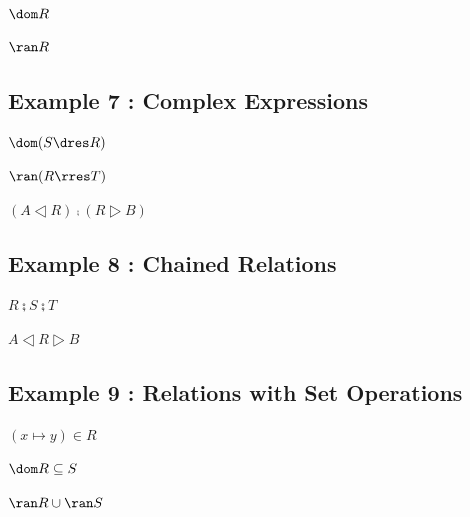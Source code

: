 \documentclass[a4paper,10pt,fleqn]{article}
\begin{document}
\noindent
$\dom R$


\noindent
$\ran R$


\subsection*{Example 7 : Complex Expressions}

\noindent
$\dom (S \dres R)$


\noindent
$\ran (R \rres T)$


\noindent
$(A \dres R) \comp (R \rres B)$


\subsection*{Example 8 : Chained Relations}

\noindent
$R \semi S \semi T$


\noindent
$A \dres R \rres B$


\subsection*{Example 9 : Relations with Set Operations}

\noindent
$(x \mapsto y) \in R$


\noindent
$\dom R \subseteq S$


\noindent
$\ran R \cup \ran S$
\end{document}
